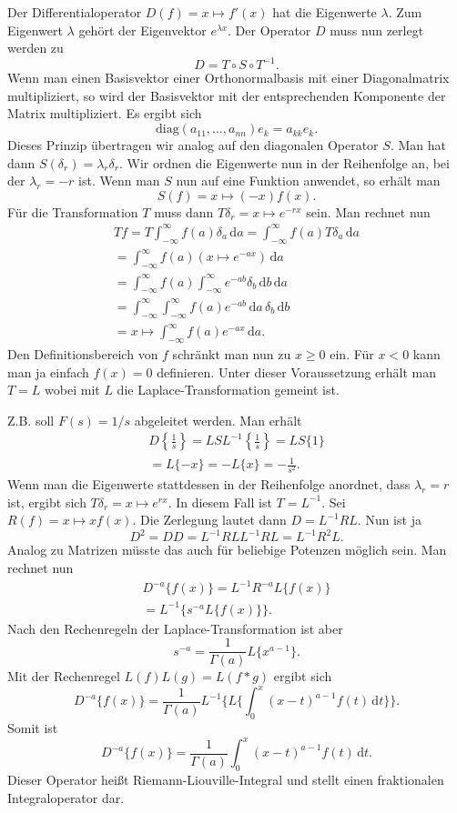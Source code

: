 \documentclass[a4paper,10pt,fleqn,twocolumn,twoside]{article}
\begin{document}
Der Differentialoperator $D(f)=x\mapsto f'(x)$ hat die
Eigenwerte $\lambda$. Zum Eigenwert $\lambda$ gehört der
Eigenvektor $e^{\lambda x}$. Der Operator $D$ muss nun zerlegt
werden zu
\[D=T\circ S\circ T^{-1}.\]
Wenn man einen Basisvektor einer Orthonormalbasis mit einer
Diagonalmatrix multipliziert, so wird der Basisvektor mit der
entsprechenden Komponente der Matrix multipliziert. Es ergibt sich
\[\mathrm{diag}(a_{11},\ldots,a_{nn})e_k = a_{kk}e_k.\]
Dieses Prinzip übertragen wir analog auf den diagonalen
Operator $S$. Man hat dann $S(\delta_r) = \lambda_r \delta_r$.
Wir ordnen die Eigenwerte nun in der Reihenfolge an, bei der
$\lambda_r=-r$ ist. Wenn man $S$ nun auf eine Funktion anwendet,
so erhält man
\[S(f) = x\mapsto (-x)f(x).\]
Für die Transformation $T$ muss dann
$T\delta_r = x\mapsto e^{-rx}$ sein.
Man rechnet nun
\begin{gather*}
Tf = T\int_{-\infty}^{\infty} f(a)\delta_a\,\mathrm da
= \int_{-\infty}^{\infty} f(a)T\delta_a\,\mathrm da\\
= \int_{-\infty}^{\infty} f(a)(x\mapsto e^{-ax})\,\mathrm da\\
= \int_{-\infty}^{\infty} f(a)\int_{-\infty}^{\infty} e^{-ab}\delta_b
\,\mathrm db\,\mathrm da\\
= \int_{-\infty}^{\infty}\int_{-\infty}^{\infty} f(a)e^{-ab}
\,\mathrm da\,\delta_b\,\mathrm db\\
= x\mapsto \int_{-\infty}^{\infty} f(a)e^{-ax}\,\mathrm da.
\end{gather*}
Den Definitionsbereich von $f$ schränkt man nun zu $x\ge 0$ ein.
Für $x<0$ kann man ja einfach $f(x)=0$ definieren. Unter dieser
Voraussetzung erhält man $T=L$ wobei mit $L$ die
Laplace-Transformation gemeint ist.

Z.B. soll $F(s)=1/s$ abgeleitet werden. Man erhält
\begin{gather*}
D\left\{\frac{1}{s}\right\}
= LSL^{-1}\left\{\frac{1}{s}\right\} = LS\{1\}\\
= L\{-x\} = -L\{x\} = -\frac{1}{s^2}.
\end{gather*}
Wenn man die Eigenwerte stattdessen in der Reihenfolge anordnet,
dass $\lambda_r=r$ ist, ergibt sich
$T\delta_r=x\mapsto e^{rx}$. In diesem Fall ist $T=L^{-1}$.
Sei $R(f)=x\mapsto xf(x)$. Die Zerlegung lautet dann
$D=L^{-1}RL$. Nun ist ja
\[D^2 = DD = L^{-1}RLL^{-1}RL = L^{-1}R^2L.\]
Analog zu Matrizen müsste das auch für beliebige Potenzen möglich
sein. Man rechnet nun
\begin{gather*}
D^{-a}\{f(x)\} = L^{-1}R^{-a}L\{f(x)\}\\
= L^{-1}\{s^{-a}L\{f(x)\}\}.
\end{gather*}
Nach den Rechenregeln der Laplace-Transformation ist aber
\[s^{-a} = \frac{1}{\Gamma(a)}L\{x^{a-1}\}.\]
Mit der Rechenregel $L(f)L(g) = L(f*g)$ ergibt sich
\[D^{-a}\{f(x)\}
= \frac{1}{\Gamma(a)}L^{-1}
\{L\{\int_0^x (x-t)^{a-1}f(t)\,\mathrm dt\}\}.\]
Somit ist
\[D^{-a}\{f(x)\}
= \frac{1}{\Gamma(a)}
\int_0^x (x-t)^{a-1}f(t)\,\mathrm dt.\]
Dieser Operator heißt Riemann-Liouville-Integral und stellt
einen fraktionalen Integraloperator dar.
\end{document}
